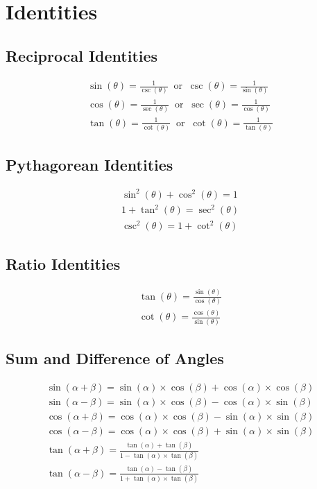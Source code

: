 \documentclass[12pt letter]{report}
\begin{document}
\section{Identities}
\subsection{Reciprocal Identities}

\begin{align*}
	\sin(\theta) = \frac{1}{\csc(\theta)} \;\; \text{or} \;\; \csc(\theta) = \frac{1}{\sin(\theta)} \\[20pt]
	\cos(\theta) = \frac{1}{\sec(\theta)}\;\; \text{or} \;\;\sec(\theta) = \frac{1}{\cos(\theta)}   \\[20pt]
	\tan(\theta) = \frac{1}{\cot(\theta)}\;\; \text{or} \;\; \cot(\theta) = \frac{1}{\tan(\theta)}
\end{align*}

\subsection{Pythagorean Identities}

\begin{align*}
	\sin^2(\theta) + \cos^2(\theta) = 1 \\
	1 + \tan^2(\theta) = \sec^2(\theta) \\
	\csc^2(\theta) = 1 + \cot^2(\theta)
\end{align*}

\subsection{Ratio Identities}
\begin{align*}
	\tan(\theta) = \frac{\sin(\theta)}{\cos(\theta)} \\
	\cot(\theta) = \frac{\cos(\theta)}{\sin(\theta)}
\end{align*}

\subsection{Sum and Difference of Angles}
\begin{align*}
	\sin(\alpha + \beta) = \sin(\alpha) \times \cos(\beta) + \cos(\alpha) \times \cos(\beta)       \\
	\sin(\alpha-\beta) = \sin(\alpha)  \times \cos(\beta) - \cos(\alpha)  \times \sin(\beta)       \\
	\cos(\alpha+\beta) = \cos(\alpha)  \times \cos(\beta) - \sin(\alpha)  \times  \sin(\beta)      \\
	\cos(\alpha - \beta) = \cos(\alpha)  \times \cos(\beta) + \sin(\alpha)  \times  \sin(\beta)    \\
	\tan(\alpha + \beta) = \frac{\tan(\alpha) + \tan(\beta)}{1- \tan(\alpha)  \times  \tan(\beta)} \\
	\tan(\alpha - \beta) = \frac{\tan(\alpha) - \tan(\beta)}{1+ \tan(\alpha)  \times  \tan(\beta)}
\end{align*}
\end{document}
